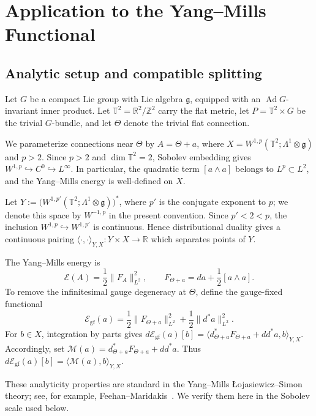 \documentclass[11pt]{article}
\theoremstyle{definition}
\theoremstyle{remark}
\begin{document}
\section{Application to the Yang--Mills Functional}\label{sec:YM}

\subsection{Analytic setup and compatible splitting}

Let $G$ be a compact Lie group with Lie algebra $\mathfrak g$, equipped with an $\operatorname{Ad}G$-invariant inner product. Let $\mathbb T^2=\mathbb R^2/\mathbb Z^2$ carry the flat metric, let $P=\mathbb T^2\times G$ be the trivial $G$-bundle, and let $\Theta$ denote the trivial flat connection.

\medskip
We parameterize connections near $\Theta$ by $A=\Theta+a$, where $X=W^{1,p}(\mathbb T^2;\Lambda^1\otimes\mathfrak g)$ and $p>2$.
Since $p>2$ and $\dim\mathbb T^2=2$, Sobolev embedding gives $W^{1,p}\hookrightarrow C^0\hookrightarrow L^\infty$. In particular, the quadratic term $[a\wedge a]$ belongs to $L^p\subset L^2$, and the Yang--Mills energy is well-defined on $X$.

Let $Y:=\bigl(W^{1,p'}(\mathbb T^2;\Lambda^1\otimes\mathfrak g)\bigr)^*$, where $p'$ is the conjugate exponent to $p$; we denote this space by $W^{-1,p}$ in the present convention. Since $p'<2<p$, the inclusion $W^{1,p}\hookrightarrow W^{1,p'}$ is continuous. Hence distributional duality gives a continuous pairing $\langle\cdot,\cdot\rangle_{Y,X}:Y\times X\to\mathbb R$ which separates points of $Y$.

The Yang--Mills energy is
$$
\mathcal E(A)=\frac12\|F_A\|_{L^2}^2,
\qquad
F_{\Theta+a}=da+\frac12[a\wedge a].
$$
To remove the infinitesimal gauge degeneracy at $\Theta$, define the gauge-fixed functional
$$
\mathcal E_{\mathrm{gf}}(a)=\frac12\|F_{\Theta+a}\|_{L^2}^2+\frac12\|d^*a\|_{L^2}^2.
$$
For $b\in X$, integration by parts gives $d\mathcal E_{\mathrm{gf}}(a)[b]=\langle d_{\Theta+a}^*F_{\Theta+a}+dd^*a,b\rangle_{Y,X}$. Accordingly, set $\mathcal M(a)=d_{\Theta+a}^*F_{\Theta+a}+dd^*a$. Thus $d\mathcal E_{\mathrm{gf}}(a)[b]=\langle\mathcal M(a),b\rangle_{Y,X}$.


These analyticity properties are standard in the Yang--Mills \L{}ojasiewicz--Simon theory; see, for example, Feehan--Maridakis~\cite[Proposition~3.1]{FeehanMaridakisMemoirs}. We verify them here in the Sobolev scale used below.
\end{document}
